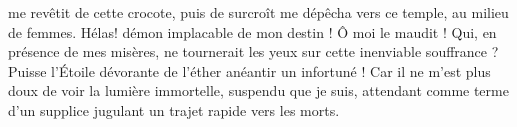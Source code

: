 \documentclass[12pt]{book}%
\newcommand{\espace}[1]{\hspace{#1}}%
\newcommand{\francais}[1]{{\policeFr #1}}%
\newlength{\larg}%
\newcommand{\decalageN}[1]{%
\settowidth{\larg}{#1}%
\espace{-\larg}%
}
\newcommand{\commentaire}[3]{\edtext{}{\Bfootnote[nonum,nosep]{\begin{adjustwidth}{-1.5cm}{-2cm}\espace{-1.5cm}\textbf{#1}\decalageN{\textbf{#1}}\espace{0pt}\espace{1.5cm}\textbf{#2} #3\end{adjustwidth}}}}%
\newcommand{\paratragiquesFr}[1]{%
\hangindent=30pt%
\espace{10pt}%
\francais{#1%
}}%
\newenvironment{groupe}{%
\pstart%
\ledgroup%
}{%
\pend %
}%
\begin{document}
\begin{pages}
\begin{Rightside}
\begin{groupe}
\paratragiquesFr{me revêtit de cette crocote,}
\end{groupe}%
\begin{groupe}%
\paratragiquesFr{puis de surcroît me dépêcha vers ce}
\end{groupe}%
\begin{groupe}%
\paratragiquesFr{temple, au milieu de femmes.}
\end{groupe}%
\begin{groupe}%
\paratragiquesFr{Hélas!}
\end{groupe}%
\begin{groupe}%
\paratragiquesFr{démon implacable de mon destin !}
\end{groupe}%
\begin{groupe}%
\paratragiquesFr{Ô moi le maudit !}
\end{groupe}%
\begin{groupe}%
\paratragiquesFr{Qui, en présence de mes misères, ne tournerait les yeux}
\end{groupe}%
\begin{groupe}%
\paratragiquesFr{sur cette inenviable souffrance ?}
\end{groupe}%
\begin{groupe}%
\paratragiquesFr{Puisse l'Étoile dévorante de l'éther}
\end{groupe}%
\begin{groupe}%
\paratragiquesFr{anéantir un infortuné !%
}
\end{groupe}%
\begin{groupe}%
\paratragiquesFr{Car il ne m'est plus doux de voir la lumière immortelle,}
\end{groupe}%
\begin{groupe}%
\paratragiquesFr{suspendu que je suis,}
\end{groupe}%
\begin{groupe}%
\paratragiquesFr{attendant comme terme d'un supplice jugulant%
}
\end{groupe}%
\begin{groupe}%
\paratragiquesFr{un trajet rapide vers les morts.%
}
\end{groupe}
\end{Rightside}
\end{pages}
\end{document}
